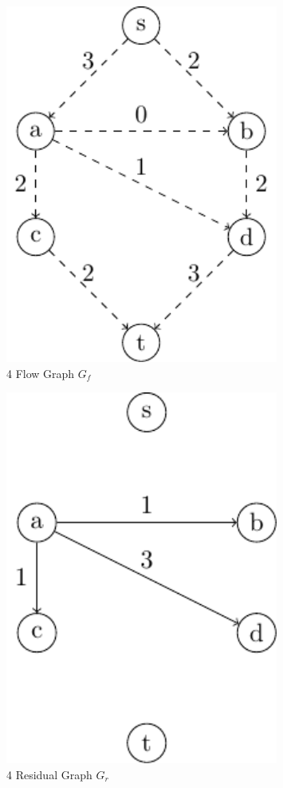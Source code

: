 \begin{minipage}{0.2\textwidth}
\begin{figure}[H]
  \centering
  \includegraphics[width=0.8\textwidth]{Figure/maxflow_d1_8.pdf}
  \caption*{4 Flow Graph \(G_f\)}
\end{figure}
\end{minipage}
\begin{minipage}{0.2\textwidth}
\begin{figure}[H]
  \centering
  \includegraphics[width=0.8\textwidth]{Figure/maxflow_d1_9.pdf}
  \caption*{4 Residual Graph \(G_r\)}
\end{figure}
\end{minipage}


